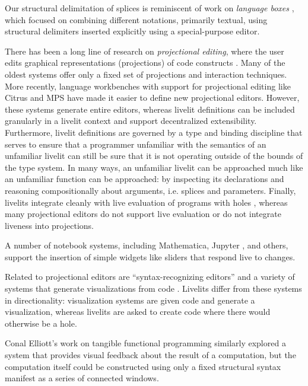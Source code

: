 Our structural delimitation of splices is reminiscent of work on 
\emph{language boxes} \cite{DBLP:conf/sle/RenggliDN09}, which focused on 
combining different notations, primarily textual, using structural delimiters inserted 
explicitly using a special-purpose editor. 

There has been a long line of research on \emph{projectional editing}, where
the user edits graphical representations (projections) of code constructs 
\cite{DBLP:journals/ile/MillerPMV94,read1996generating,DBLP:conf/sde/Reiss84,DBLP:conf/uist/KoM05}. 
Many of the oldest systems offer only a fixed set of projections and interaction techniques. 
More recently, language workbenches with support for projectional editing like Citrus \cite{DBLP:conf/uist/KoM05}
and MPS \cite{voelter2011language} have made it easier to define new projectional editors.
However, these systems generate entire editors, whereas livelit definitions can be 
included granularly in a livelit context and support decentralized extensibility.
Furthermore, livelit definitions are governed by a type and binding discipline that 
serves to ensure that a programmer unfamiliar with the semantics of an unfamiliar livelit
can still be sure that it is not operating outside of the bounds of the type system.
In many ways, an unfamiliar livelit can be approached much like an unfamiliar function
can be approached: by inspecting its declarations and reasoning compositionally 
about arguments, i.e. splices and parameters.
Finally, livelits integrate cleanly with live evaluation of programs with holes \cite{HazelnutLive},
whereas many projectional editors do not support live evaluation or do 
not integrate liveness into projections.

A number of notebook systems, including Mathematica, Jupyter \cite{Guo13}, and others, 
support the insertion of simple widgets like sliders that respond live to changes.
 

Related to projectional editors are ``syntax-recognizing editors'' \cite{DBLP:journals/tosem/BallanceGV92,DBLP:conf/sde/HorganM84} and 
a variety of systems that generate visualizations from code \cite{DBLP:conf/chi/Lerner20,koschke2003software,urquiza2004survey}. Livelits differ 
from these systems in directionality: visualization systems are given code and generate
a visualization, whereas livelits are asked to create code where there would otherwise
be a hole.

Conal Elliott's work on tangible functional programming \cite{DBLP:conf/icfp/Elliott07} similarly explored a
system that provides visual feedback about the result of a computation, 
but the computation itself could be constructed using only a fixed structural syntax
manifest as a series of connected windows.

